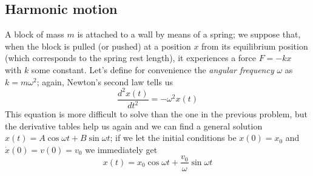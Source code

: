 \documentclass[11pt, a4paper,oneside,openright]{book}
\numberwithin{equation}{section}
\begin{document}
\subsection{Harmonic motion}
A block of mass $m$ is attached to a wall by means of a spring; we suppose that, when the block is pulled (or pushed) at a position $x$ from its equilibrium position (which corresponds to the spring rest length), it experiences a force $F=-kx$ with $k$ some constant. Let's define for convenience the \textit{angular frequency} $\omega$ as $k=m\omega^2$; again, Newton's second law tells us
\begin{equation}
\label{simpleharmonic}
\frac{d^2x(t)}{dt^2}=-\omega^2 x(t)
\end{equation}
This equation is more difficult to solve than the one in the previous problem, but the derivative tables help us again and we can find a general solution $x(t)=A\cos{\omega t}+B\sin{\omega t}$; if we let the initial conditions be $x(0)=x_0$ and $\dot{x}(0)=v(0)=v_0$ we immediately get
\begin{equation}
x(t)=x_0\cos{\omega t} + \frac{v_0}{\omega}\sin{\omega t}
\end{equation}
\end{document}
